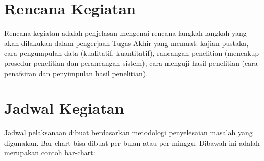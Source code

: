 \section{Rencana Kegiatan}
Rencana kegiatan adalah penjelasan mengenai rencana langkah-langkah yang akan dilakukan dalam pengerjaan Tugas Akhir yang memuat: kajian pustaka, cara pengumpulan data (kualitatif, kuantitatif), rancangan penelitian (mencakup prosedur penelitian dan perancangan sistem), cara menguji hasil penelitian (cara penafsiran dan penyimpulan hasil penelitian).

\section{Jadwal Kegiatan}

Jadwal pelaksanaan dibuat berdasarkan metodologi penyelesaian masalah yang digunakan. Bar-chart bisa dibuat per bulan atau per minggu. Dibawah ini adalah merupakan contoh bar-chart:

